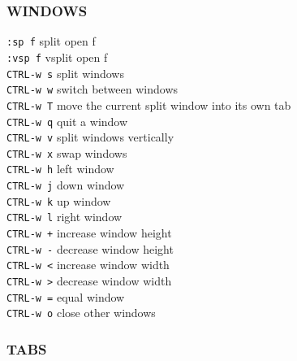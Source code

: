 \documentclass[10pt,a4paper,landscape]{article}
\begin{document}
\begin{multicols}{3}
    
    \subsubsection*{
    WINDOWS
    }
    
    \colorbox{gray!20}{\lstinline{:sp f}}               split open f \\
    \colorbox{gray!20}{\lstinline{:vsp f}}              vsplit open f \\
    \colorbox{gray!20}{\lstinline{CTRL-w s}}            split windows \\
    \colorbox{gray!20}{\lstinline{CTRL-w w}}            switch between windows \\
    \colorbox{gray!20}{\lstinline{CTRL-w T}}            move the current split window into its own tab \\
    \colorbox{gray!20}{\lstinline{CTRL-w q}}            quit a window \\
    \colorbox{gray!20}{\lstinline{CTRL-w v}}            split windows vertically \\
    \colorbox{gray!20}{\lstinline{CTRL-w x}}            swap windows \\
    \colorbox{gray!20}{\lstinline{CTRL-w h}}            left window \\
    \colorbox{gray!20}{\lstinline{CTRL-w j}}            down window \\
    \colorbox{gray!20}{\lstinline{CTRL-w k}}            up window \\
    \colorbox{gray!20}{\lstinline{CTRL-w l}}            right window \\
    \colorbox{gray!20}{\lstinline{CTRL-w +}}            increase window height \\
    \colorbox{gray!20}{\lstinline{CTRL-w -}}            decrease window height \\
    \colorbox{gray!20}{\lstinline{CTRL-w <}}            increase window width \\
    \colorbox{gray!20}{\lstinline{CTRL-w >}}            decrease window width \\
    \colorbox{gray!20}{\lstinline{CTRL-w =}}            equal window \\
    \colorbox{gray!20}{\lstinline{CTRL-w o}}            close other windows \\
    
    
    \subsubsection*{
    TABS
    }
    

\end{multicols}
\end{document}
